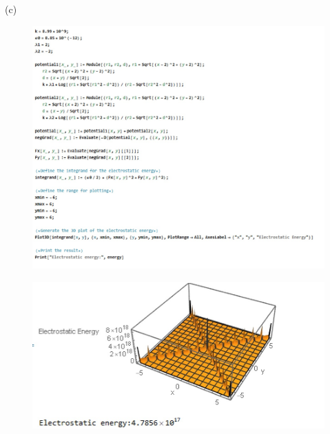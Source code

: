 \documentclass[journal,12pt,onecolumn]{IEEEtran}
\theoremstyle{remark}
\begin{document}
\newpage
(c)\begin{figure}[H]
    \centering
     \includegraphics[scale=0.5]{figs/u31.jpeg}
    \caption{}    
    \label{fig:ishitha.em.fig1}
   \end{figure} 
   \begin{figure}[H]
    \centering
     \includegraphics[scale=0.5]{figs/u32.jpeg}
    \caption{}    
    \label{fig:ishitha.em.fig1}
   \end{figure}  
\end{document}
